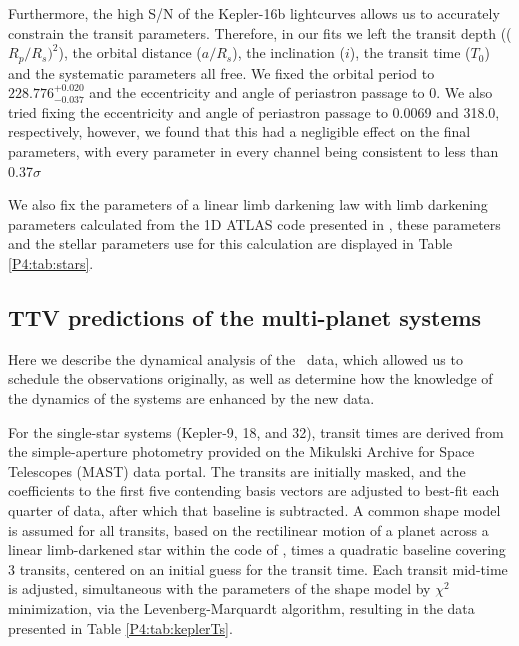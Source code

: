 Furthermore, the high S/N of the Kepler-16b lightcurves allows us to accurately constrain the transit parameters. Therefore, in our fits we left the transit depth (($R_p/R_s)^2$), the orbital distance ($a/R_s$), the inclination ($i$), the transit time ($T_0$) and the systematic parameters all free. We fixed the orbital period to $228.776_{-0.037}^{+0.020}$ \citep{Doyle2011} and the eccentricity and angle of periastron passage to 0. We also tried fixing the eccentricity and angle of periastron passage to 0.0069 and 318.0, respectively, however, we found that this had a negligible effect on the final parameters, with every parameter in every channel being consistent to less than 0.37$\sigma$

We also fix the parameters of a linear limb darkening law with limb darkening parameters calculated from the 1D ATLAS code presented in \citep{Sing2010}, these parameters and the stellar parameters use for this calculation are displayed in Table \ref{P4:tab:stars}.

\subsection{TTV predictions of the multi-planet systems}
\label{P4:sec:TTVpred}

Here we describe the dynamical analysis of the \Kepler~data, which allowed us to schedule the \spitzer observations originally, as well as determine how the knowledge of the dynamics of the systems are enhanced by the new data.

For the single-star systems (Kepler-9, 18, and 32), transit times are derived from the simple-aperture photometry provided on the Mikulski Archive for Space Telescopes (MAST) data portal. The transits are initially masked, and the coefficients to the first five contending basis vectors are adjusted to best-fit each quarter of data, after which that baseline is subtracted. A common shape model is assumed for all transits, based on the rectilinear motion of a planet across a linear limb-darkened star within the code of \cite{Mandel2002}, times a quadratic baseline covering 3 transits, centered on an initial guess for the transit time. Each transit mid-time is adjusted, simultaneous with the parameters of the shape model by $\chi^2$ minimization, via the Levenberg-Marquardt algorithm, resulting in the data presented in Table \ref{P4:tab:keplerTs}.

